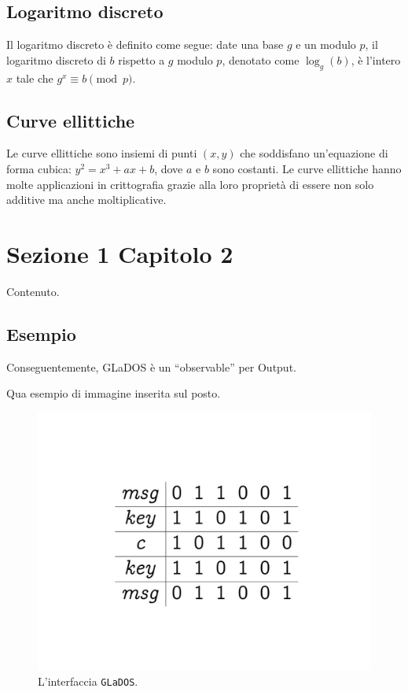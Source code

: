 \documentclass[a4paper,12pt]{report}
\begin{document}
\subsection*{Logaritmo discreto}
Il logaritmo discreto è definito come segue: date una base \( g \) e un modulo \( p \), il logaritmo discreto di \( b \) rispetto a \( g \) modulo \( p \), denotato come \( \log_g(b) \), è l'intero \( x \) tale che \( g^x \equiv b \pmod{p} \).

\subsection*{Curve ellittiche}
Le curve ellittiche sono insiemi di punti \( (x, y) \) che soddisfano un'equazione di forma cubica: \( y^2 = x^3 + ax + b \), dove \( a \) e \( b \) sono costanti. Le curve ellittiche hanno molte applicazioni in crittografia grazie alla loro proprietà di essere non solo additive ma anche moltiplicative.

\section{Sezione 1 Capitolo 2}

Contenuto.

\subsection*{Esempio}
Conseguentemente, GLaDOS è un ``observable'' per Output.

Qua esempio di immagine inserita sul posto.

\begin{figure}[h]
\centering{}
\includegraphics[width=\textwidth]{img/example_img.pdf}
\caption{L'interfaccia \texttt{GLaDOS}.}
\label{img:example}
\end{figure}
\end{document}
